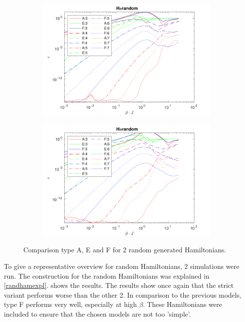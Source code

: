 \begin{figure}[!htbp]
    \begin{subfigure}[]{\textwidth}
        \includegraphics[width=\textwidth]{Figuren/benchmarking/1D_Raand.pdf}
        \subcaption{}
    \end{subfigure}

    \begin{subfigure}[]{\textwidth}
        \includegraphics[width=\textwidth]{Figuren/benchmarking/1D_Raand_2.pdf}
        \subcaption{}
    \end{subfigure}

    \caption{Comparison type A, E and F for 2 random generated Hamiltonians.}
    \label{fig:benchmark:trand}
\end{figure}

To give a representative overview for random Hamiltonians, 2 simulations were run. The construction for the random Hamiltonians was explained in \cref{randhamexpl}.  shows the results. The results show once again that the strict variant performs worse than the other 2. In comparison to the previous models, type F performs very well, especially at high $\beta$.  These Hamiltonians were included to ensure that the chosen models are not too 'simple'.


